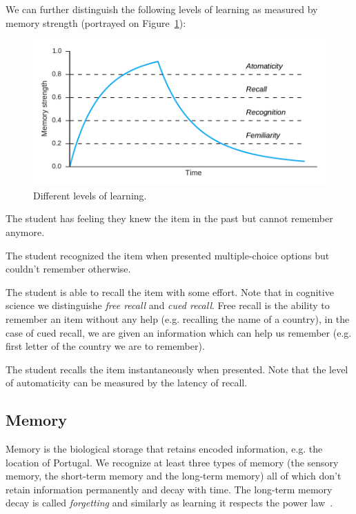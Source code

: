 We can further distinguish the following levels of learning as measured by memory strength (portrayed on Figure~\ref{fig:knowledge-levels}):

\begin{figure}[htbp]
  \centering
  \includegraphics[width=\textwidth]{img/knowledge-levels}
  \caption{Different levels of learning.}
  \label{fig:knowledge-levels}
\end{figure}

\begin{description}[leftmargin=0cm]
  \item[Familiarity] The student has feeling they knew the item in the past but cannot remember anymore.
  \item[Recognition] The student recognized the item when presented multiple-choice options but couldn't remember otherwise.
  \item[Recall] The student is able to recall the item with some effort. Note that in cognitive science we distinguishe \textit{free recall} and \textit{cued recall}. Free recall is the ability to remember an item without any help (e.g. recalling the name of a country), in the case of cued recall, we are given an information which can help us remember (e.g. first letter of the country we are to remember).
  \item[Automaticity] The student recalls the item instantaneously when presented. Note that the level of automaticity can be measured by the latency of recall.
\end{description}

\subsection{Memory}

Memory is the biological storage that retains encoded information, e.g. the location of Portugal. We recognize at least three types of memory (the sensory memory, the short-term memory and the long-term memory) all of which don't retain information permanently and decay with time. The long-term memory decay is called \textit{forgetting} and similarly as learning it respects the power law~\cite{MichaelW.Eysenck2008}.

